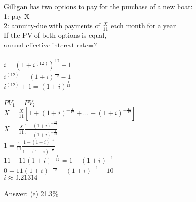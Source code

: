 \documentclass[12pt]{article}
\begin{document}
\section{}
Gilligan has two options to pay for the purchase of a new boat:\\
1: pay X\\
2: annuity-due with payments of $\frac{X}{11}$ each month for a year\\
If the PV of both options is equal,\\
annual effective interest rate=?\\
\\
$i=(1+i^{(12)})^{12}-1$\\
$i^{(12)}=(1+i)^{\frac{1}{12}}-1$\\
$i^{(12)}+1=(1+i)^{\frac{1}{12}}$\\
\\
$PV_1=PV_2$\\
$X=\frac{X}{11}[1+(1+i)^{-\frac{1}{12}}+...+(1+i)^{-\frac{11}{12}}]$\\
$X=\frac{X}{11}\frac{1-(1+i)^{-\frac{12}{12}}}{1-(1+i)^{-\frac{1}{12}}}$\\
$1=\frac{1}{11}\frac{1-(1+i)^{-1}}{1-(1+i)^{-\frac{1}{12}}}$\\
$11-11(1+i)^{-\frac{1}{12}}=1-(1+i)^{-1}$\\
$0=11(1+i)^{-\frac{1}{12}}-(1+i)^{-1}-10$\\
$i\approx0.21314$\\
\\
Answer: (e) 21.3\%
\end{document}
